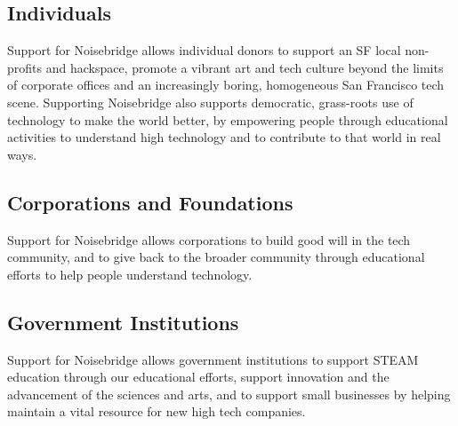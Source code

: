 \documentclass[12pt]{article}
\begin{document}
\subsection{Individuals}

Support for Noisebridge allows individual donors to support an SF local non-profits and hackspace, promote a vibrant art and tech culture beyond the limits of corporate offices and an increasingly boring, homogeneous San Francisco tech scene. Supporting Noisebridge also supports democratic, grass-roots use of technology to make the world better, by empowering people through educational activities to understand high technology and to contribute to that world in real ways.

\subsection{Corporations and Foundations}

Support for Noisebridge allows corporations to build good will in the tech community, and to give back to the broader community through educational efforts to help people understand technology.

\subsection{Government Institutions}

Support for Noisebridge allows government institutions to support STEAM education through our educational efforts, support innovation and the advancement of the sciences and arts, and to support small businesses by helping maintain a vital resource for new high tech companies.
\end{document}
